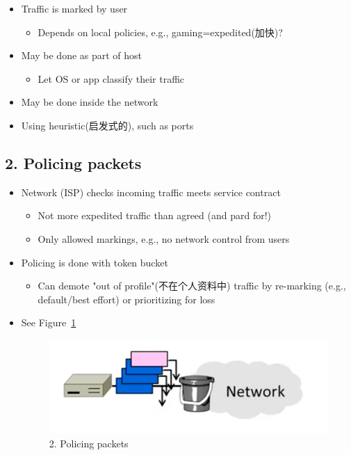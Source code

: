 \documentclass[12pt]{ctexart}   %
\begin{document}
\begin{itemize}
		\item Traffic is marked by user
		\begin{itemize}
			\item Depends on local policies, e.g., gaming=expedited(加快)?
		\end{itemize}

		\item May be done as part of host
		\begin{itemize}
			\item Let OS or app classify their traffic
		\end{itemize}

		\item May be done inside the network
		\item Using heuristic(启发式的), such as ports
	\end{itemize}
	
	\subsection{{\color{blue} 2.} Policing packets}
	\begin{itemize}
		\item Network (ISP) checks incoming traffic meets service contract
		\begin{itemize}
			\item Not more expedited traffic than agreed (and pard for!)
			\item Only allowed markings, e.g., no network control from users
		\end{itemize}

		\item Policing is done with token bucket
		\begin{itemize}
			\item Can demote "out of profile"(不在个人资料中) traffic by re-marking (e.g., default/best effort) or prioritizing for loss
		\end{itemize}
		\item See Figure~\ref{fig:9-6-6}
		  
		\begin{figure}[h!] %
		\centering
		\includegraphics[scale=0.7]{images/9-6-6}
		\caption{ 2. Policing packets }
		\label{fig:9-6-6}
		\end{figure}
	\end{itemize}
\end{document}
